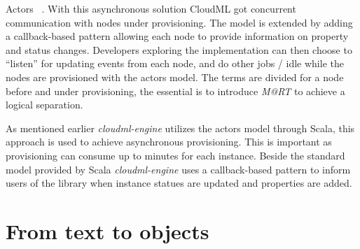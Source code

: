 Actors ~\cite{actors:haller07}.
With this asynchronous solution CloudML got concurrent communication with nodes under provisioning.
The model is extended by adding a callback-based pattern allowing each node to provide 
information on property and status changes.
Developers exploring the implementation can then choose to ``listen'' for updating events from each node,
and do other jobs / idle while the nodes are provisioned with the actors model.
The terms are divided for a node before and under provisioning, the essential is to introduce 
\emph{M@RT} to achieve a logical separation.

\hr

As mentioned earlier \emph{cloudml-engine} utilizes the actors model through Scala,
this approach is used to achieve asynchronous provisioning.
This is important as provisioning can consume up to minutes for each instance.
Beside the standard model provided by Scala \emph{cloudml-engine} uses
a callback-based pattern to inform users of the library when instance statues
are updated and properties are added.

\section{From text to objects}



